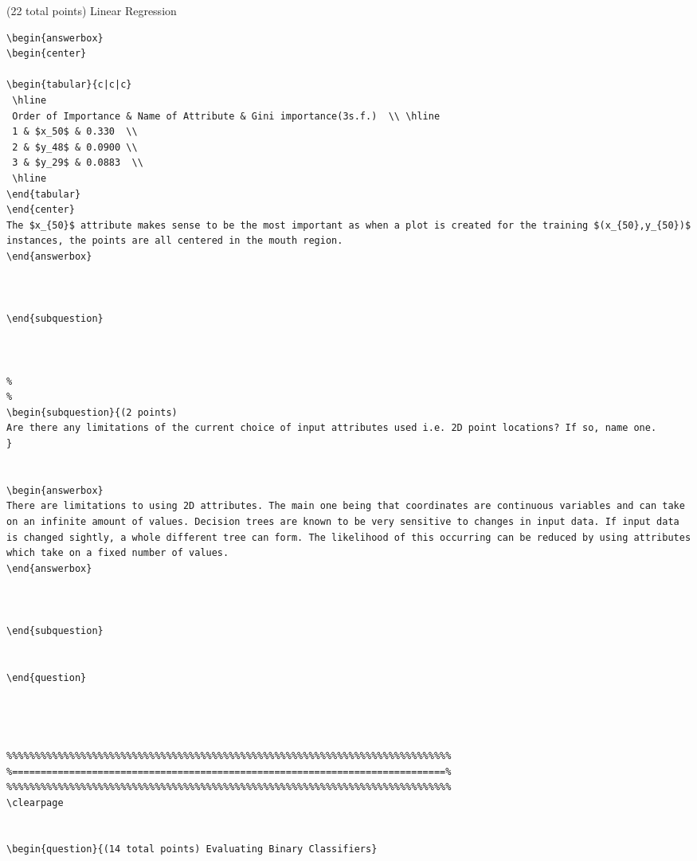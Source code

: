 \documentclass[12pt]{article}
\begin{document}
\begin{question}{(22 total points) Linear Regression}
\begin{subquestion}
\begin{answerbox}{20em}
\begin {verbatim}
\begin{answerbox}{10em}
\begin{center}

\begin{tabular}{c|c|c}
 \hline
 Order of Importance & Name of Attribute & Gini importance(3s.f.)  \\ \hline
 1 & $x_50$ & 0.330  \\
 2 & $y_48$ & 0.0900 \\
 3 & $y_29$ & 0.0883  \\
 \hline
\end{tabular}
\end{center}
The $x_{50}$ attribute makes sense to be the most important as when a plot is created for the training $(x_{50},y_{50})$ instances, the points are all centered in the mouth region.
\end{answerbox}



\end{subquestion}



%
%
\begin{subquestion}{(2 points) 
Are there any limitations of the current choice of input attributes used i.e. 2D point locations? If so, name one. 
}


\begin{answerbox}{10em}
There are limitations to using 2D attributes. The main one being that coordinates are continuous variables and can take on an infinite amount of values. Decision trees are known to be very sensitive to changes in input data. If input data is changed sightly, a whole different tree can form. The likelihood of this occurring can be reduced by using attributes which take on a fixed number of values.
\end{answerbox}



\end{subquestion}


\end{question}




\clearpage


\begin{question}{(14 total points) Evaluating Binary Classifiers}


\end{verbatim}
\end{answerbox}
\end{subquestion}
\end{question}
\end{document}
